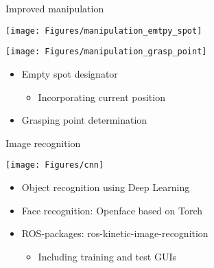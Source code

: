 \documentclass[12pt,a4paper]{article}
\newcommand{\emptylogo}{\texttt{[image: Figures/Empty]}}
\begin{document}
\begin{slidetop}
\begin{multicols}{2}
\begin{bclogo}[couleur = white, arrondi = 0.25, couleurBord = tuedarkblue , barre = none, logo=\emptylogo]{\textcolor{tuedarkblue}{Improved manipulation}}
\medskip %
\begin{minipage}[T]{0.48\textwidth}
    \begin{center}
        \texttt{[image: Figures/manipulation\_emtpy\_spot]}
    \end{center}
\end{minipage}
\hfill
\begin{minipage}[T]{0.48\textwidth}
    \begin{center}
        \texttt{[image: Figures/manipulation\_grasp\_point]}
    \end{center}
\end{minipage}
\begin{itemize}[itemsep = 0pt, parsep = 0pt, leftmargin=15pt]
	\item Empty spot designator
    \begin{itemize}[itemsep = 0pt, parsep = 0pt, leftmargin=15pt]
		\item Incorporating current position
	\end{itemize}
	\item Grasping point determination
\end{itemize}
\end{bclogo}

\vspace{-0.8cm} %

\begin{bclogo}[couleur = white, arrondi = 0.25, couleurBord = tuedarkblue , barre = none, logo=\emptylogo]{\textcolor{tuedarkblue}{Image recognition}}
\medskip %
\begin{minipage}[T]{\textwidth}
    \begin{center}
        \texttt{[image: Figures/cnn]}
    \end{center}
\end{minipage}
\begin{itemize}[itemsep = 0pt, parsep = 0pt, leftmargin=15pt]
	\item Object recognition using Deep Learning
	\item Face recognition: Openface based on Torch
    \item ROS-packages: ros-kinetic-image-recognition
    \begin{itemize}[itemsep = 0pt, parsep = 0pt, leftmargin=15pt]
		\item Including training and test GUIs
	\end{itemize}
\end{itemize}
\end{bclogo}


\end{multicols}
\end{slidetop}
\end{document}
